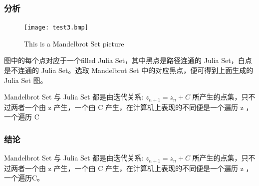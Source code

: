 \documentclass{beamer}
\begin{document}
\begin{frame}
  \frametitle{分析}
  \begin{figure}[H]
  \texttt{[image: test3.bmp]}
  \caption{This is a Mandelbrot Set picture}
  \end{figure}
  图中的每个点对应于一个filled Julia Set，其中黑点是路径连通的 Julia Set，白点是不连通的 Julia Set。选取 Mandelbrot Set 中的对应黑点，便可得到上面生成的 Julia Set 图。

  Mandelbrot Set 与 Julia Set 都是由迭代关系: $z_{n+1} = z_n + C$ 所产生的点集，只不过两者一个由 z 产生，一个由 C 产生，在计算机上表现的不同便是一个遍历 z ，一个遍历 C 
\end{frame}

\begin{frame}
  \frametitle{结论}
  Mandelbrot Set 与 Julia Set 都是由迭代关系: $z_{n+1} = z_n + C$ 所产生的点集，只不过两者一个由 z 产生，一个由 C 产生，在计算机上表现的不同便是一个遍历 z ，一个遍历C。
\end{frame}
\end{document}
